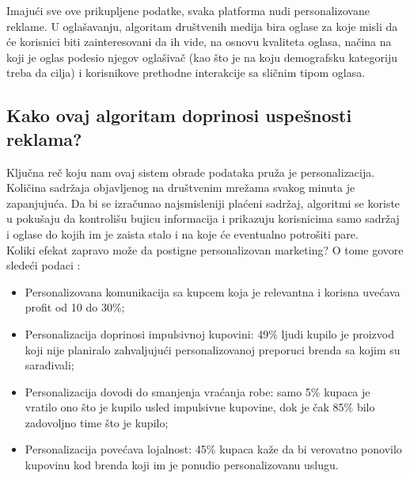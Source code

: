 \documentclass[a4paper]{article}
\begin{document}
	Imajući sve ove prikupljene podatke, svaka platforma nudi personalizovane reklame.  U oglašavanju, algoritam društvenih medija bira oglase za koje misli da će korisnici biti zainteresovani da ih vide, na osnovu kvaliteta oglasa, načina na koji je oglas podesio njegov 		oglašivač (kao što je na koju demografsku kategoriju treba da cilja) i korisnikove prethodne interakcije sa sličnim tipom oglasa.  \cite{algoritmi}
	
	\subsection{Kako ovaj algoritam doprinosi uspešnosti reklama?}
	\label{subsec:uspesnostreklama}
	Ključna reč koju nam ovaj sistem obrade podataka pruža je personalizacija. Količina sadržaja objavljenog na društvenim mrežama svakog minuta je zapanjujuća. Da bi se izračunao najsmisleniji plaćeni sadržaj, algoritmi se koriste u pokušaju da kontrolišu bujicu 		informacija i prikazuju korisnicima samo sadržaj i oglase do kojih im je zaista stalo i na koje će eventualno potrošiti pare.\\
	Koliki efekat zapravo može da postigne personalizovan marketing?	O tome govore sledeći podaci \cite{statistikai}:\\
	\begin{itemize}
		\item Personalizovana komunikacija sa kupcem koja je relevantna i korisna uvećava profit od 10 do 30\%;
		\item Personalizacija doprinosi impulsivnoj kupovini: 49\% ljudi kupilo je proizvod koji nije planiralo zahvaljujući personalizovanoj preporuci brenda sa kojim su sarađivali;
		\item Personalizacija dovodi do smanjenja vraćanja robe: samo 5\% kupaca je vratilo ono što je kupilo usled impulsivne kupovine, dok je čak 85\% bilo zadovoljno time što je kupilo;
		\item Personalizacija povećava lojalnost: 45\% kupaca kaže da bi verovatno ponovilo kupovinu kod brenda koji im je ponudio personalizovanu uslugu.
	\end{itemize} \\
	
	
\end{document}
